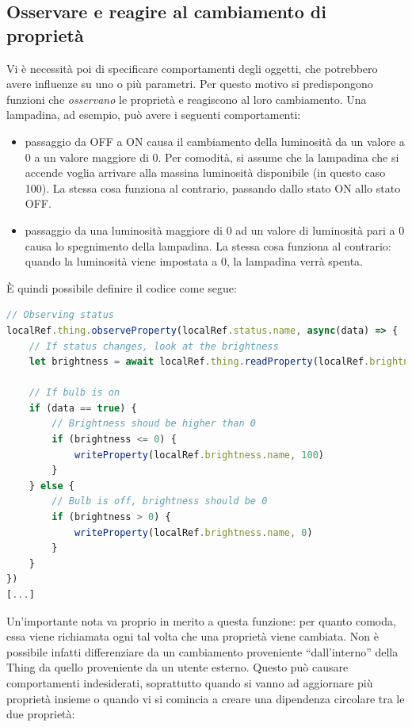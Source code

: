 \documentclass[12pt,a4paper,openright,oneside]{report}
\newcommand{\quotes}[1]{``#1''}
\begin{document}
\subsection{Osservare e reagire al cambiamento di proprietà}
\label{sec:observe_react}
Vi è necessità poi di specificare comportamenti degli oggetti, che potrebbero avere influenze su uno o più parametri. Per questo motivo si predispongono funzioni che \textit{osservano} le proprietà e reagiscono al loro cambiamento. Una lampadina, ad esempio, può avere i seguenti comportamenti:

\begin{itemize}
	\item passaggio da OFF a ON causa il cambiamento della luminosità da un valore a 0 a un valore maggiore di 0. Per comodità, si assume che la lampadina che si accende voglia arrivare alla massina luminosità disponibile (in questo caso 100). La stessa cosa funziona al contrario, passando dallo stato ON allo stato OFF.
	
	\item passaggio da una luminosità maggiore di 0 ad un valore di luminosità pari a 0 causa lo spegnimento della lampadina. La stessa cosa funziona al contrario: quando la luminosità viene impostata a 0, la lampadina verrà spenta.
\end{itemize}

È quindi possibile definire il codice come segue:

\begin{lstlisting}[language=JavaScript,caption={Reagire al cambiamento delle proprietà in \texttt{bulb.js}}, label=lst:Circular]
// Observing status
localRef.thing.observeProperty(localRef.status.name, async(data) => {
	// If status changes, look at the brightness
	let brightness = await localRef.thing.readProperty(localRef.brightness.name)
	
	// If bulb is on
	if (data == true) {
		// Brightness shoud be higher than 0
		if (brightness <= 0) {
			writeProperty(localRef.brightness.name, 100)
		}
	} else {
		// Bulb is off, brightness should be 0
		if (brightness > 0) {
			writeProperty(localRef.brightness.name, 0)
		}
	}
})
[...]
\end{lstlisting}

Un'importante nota va proprio in merito a questa funzione: per quanto comoda, essa viene richiamata ogni tal volta che una proprietà viene cambiata. Non è possibile infatti differenziare da un cambiamento proveniente \quotes{dall'interno} della Thing da quello proveniente da un utente esterno. Questo può causare comportamenti indesiderati, soprattutto quando si vanno ad aggiornare più proprietà insieme o quando vi si comincia a creare una dipendenza circolare tra le due proprietà:\\
\end{document}
